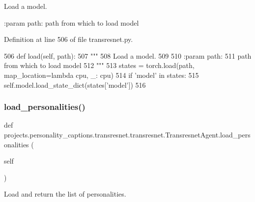 \begin{DoxyVerb}Load a model.

:param path:
    path from which to load model
\end{DoxyVerb}
 

Definition at line 506 of file transresnet.\+py.


\begin{DoxyCode}
506     \textcolor{keyword}{def }load(self, path):
507         \textcolor{stringliteral}{"""}
508 \textcolor{stringliteral}{        Load a model.}
509 \textcolor{stringliteral}{}
510 \textcolor{stringliteral}{        :param path:}
511 \textcolor{stringliteral}{            path from which to load model}
512 \textcolor{stringliteral}{        """}
513         states = torch.load(path, map\_location=\textcolor{keyword}{lambda} cpu, \_: cpu)
514         \textcolor{keywordflow}{if} \textcolor{stringliteral}{'model'} \textcolor{keywordflow}{in} states:
515             self.model.load\_state\_dict(states[\textcolor{stringliteral}{'model'}])
516 \end{DoxyCode}
\mbox{\label{classprojects_1_1personality__captions_1_1transresnet_1_1transresnet_1_1TransresnetAgent_a7e7fa664b89790467ceef3a41cfb623e}} 
\subsubsection{\texorpdfstring{load\+\_\+personalities()}{load\_personalities()}}
{\footnotesize\ttfamily def projects.\+personality\+\_\+captions.\+transresnet.\+transresnet.\+Transresnet\+Agent.\+load\+\_\+personalities (\begin{DoxyParamCaption}\item[{}]{self }\end{DoxyParamCaption})}

\begin{DoxyVerb}Load and return the list of personalities.
\end{DoxyVerb}
 


